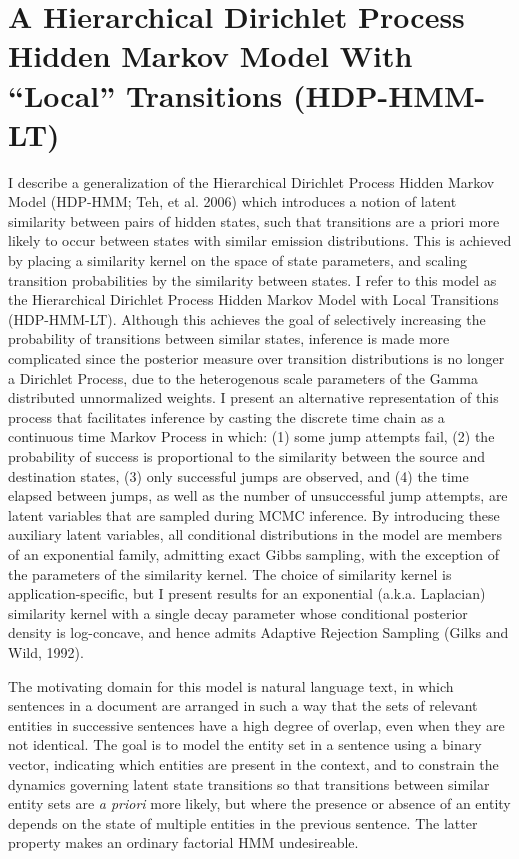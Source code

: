 \documentclass[12pt,letterpaper]{report}
\begin{document}
\chapter{A Hierarchical Dirichlet Process Hidden Markov Model With ``Local'' Transitions (HDP-HMM-LT)}
 I describe a generalization of the Hierarchical Dirichlet Process
Hidden Markov Model (HDP-HMM; Teh, et al. 2006)
which introduces a notion of latent similarity between pairs of hidden
states, such that transitions are a priori more likely to occur between states
with similar emission distributions.  This is achieved by
placing a similarity kernel on the space of state parameters, and
scaling transition probabilities by the similarity between states.  
I refer to this model as the Hierarchical Dirichlet Process Hidden Markov Model with Local
Transitions (HDP-HMM-LT).  Although this achieves the goal of selectively increasing the
probability of transitions between similar states, inference is made
more complicated since the posterior measure over transition
distributions is no longer a Dirichlet Process, due to the
heterogenous scale parameters of the Gamma distributed unnormalized
weights.  I present an alternative representation of this process that facilitates
inference by casting the discrete time chain as a continuous time Markov Process
in which: (1) some jump attempts fail, (2) the probability of success is
proportional to the similarity between the source and destination
states, (3) only successful jumps are observed,
and (4) the time elapsed between jumps, as well as the number of
unsuccessful jump attempts, are latent variables that are sampled
during MCMC inference.  By introducing these auxiliary latent variables, all
conditional distributions in the model are members of an exponential
family, admitting exact Gibbs sampling,
with the exception of the parameters of the similarity kernel.
The choice of similarity kernel is application-specific, but I present
results for an exponential (a.k.a. Laplacian) similarity kernel with a single decay parameter
whose conditional posterior density is log-concave, and hence admits
Adaptive Rejection Sampling (Gilks and Wild, 1992).

The motivating domain for this model is natural language text, in
which sentences in a document are arranged in such a way that
the sets of relevant entities in successive sentences have a high
degree of overlap, even when they are not identical.  The goal is to model the
entity set in a sentence using a binary vector, indicating which
entities are present in the context, and to constrain the dynamics 
governing latent state transitions so that
transitions between similar entity sets are {\it a priori} more
likely, but where the presence or absence of an entity depends on
the state of multiple entities in the previous sentence.  The latter
property makes an ordinary factorial HMM undesireable.  
\end{document}
